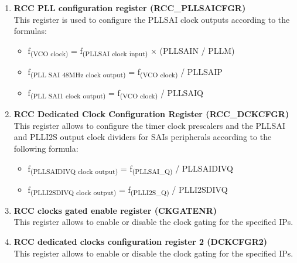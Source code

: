 \documentclass[footheight=20pt, footsepline, headheight=20pt, headsepline]{scrartcl}
\begin{document}
\begin{enumerate}
    \item \textbf{RCC PLL configuration register (RCC\_PLLSAICFGR)}
        \\ This register is used to configure the PLLSAI clock outputs according to the formulas:
        \begin{itemize}
            \item f\textsubscript{(VCO clock)} = f\textsubscript{(PLLSAI clock input)} × (PLLSAIN / PLLM)
            \item f\textsubscript{(PLL SAI 48MHz clock output)} = f\textsubscript{(VCO clock)} / PLLSAIP
            \item f\textsubscript{(PLL SAI1 clock output)} = f\textsubscript{(VCO clock)} / PLLSAIQ
        \end{itemize}
    \item \textbf{RCC Dedicated Clock Configuration Register (RCC\_DCKCFGR)}
        \\ This register allows to configure the timer clock prescalers and the PLLSAI and PLLI2S output clock dividers for SAIs peripherals according to the following formula:
        \begin{itemize}
            \item f\textsubscript{(PLLSAIDIVQ clock output)} = f\textsubscript{(PLLSAI\_Q)} / PLLSAIDIVQ
            \item f\textsubscript{(PLLI2SDIVQ clock output)} = f\textsubscript{(PLLI2S\_Q)} / PLLI2SDIVQ
        \end{itemize}
    \item \textbf{RCC clocks gated enable register (CKGATENR)}
        \\ This register allows to enable or disable the clock gating for the specified IPs.
    \item \textbf{RCC dedicated clocks configuration register 2 (DCKCFGR2)}
        \\ This register allows to enable or disable the clock gating for the specified IPs.
\end{enumerate}
\end{document}

